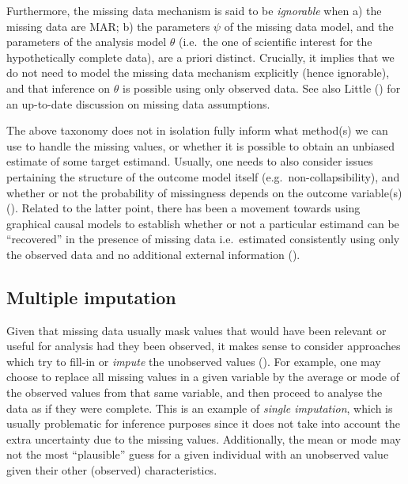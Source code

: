 \documentclass[
  letterpaper,
  DIV=11,
  numbers=noendperiod]{scrreprt}
\begin{document}
Furthermore, the missing data mechanism is said to be \emph{ignorable}
when a) the missing data are MAR; b) the parameters \(\psi\) of the
missing data model, and the parameters of the analysis model \(\theta\)
(i.e.~the one of scientific interest for the hypothetically complete
data), are a priori distinct. Crucially, it implies that we do not need
to model the missing data mechanism explicitly (hence ignorable), and
that inference on \(\theta\) is possible using only observed data. See
also Little () for
an up-to-date discussion on missing data assumptions.

The above taxonomy does not in isolation fully inform what method(s) we
can use to handle the missing values, or whether it is possible to
obtain an unbiased estimate of some target estimand. Usually, one needs
to also consider issues pertaining the structure of the outcome model
itself (e.g.~non-collapsibility), and whether or not the probability of
missingness depends on the outcome variable(s)
(). Related to the latter point, there has been a movement towards
using graphical causal models to establish whether or not a particular
estimand can be ``recovered'' in the presence of missing data
i.e.~estimated consistently using only the observed data and no
additional external information
().

\subsection{Multiple imputation}\label{multiple-imputation}

Given that missing data usually mask values that would have been
relevant or useful for analysis had they been observed, it makes sense
to consider approaches which try to fill-in or \emph{impute} the
unobserved values
(). For example, one may choose to replace all missing values in a
given variable by the average or mode of the observed values from that
same variable, and then proceed to analyse the data as if they were
complete. This is an example of \emph{single imputation}, which is
usually problematic for inference purposes since it does not take into
account the extra uncertainty due to the missing values. Additionally,
the mean or mode may not the most ``plausible'' guess for a given
individual with an unobserved value given their other (observed)
characteristics.
\end{document}
